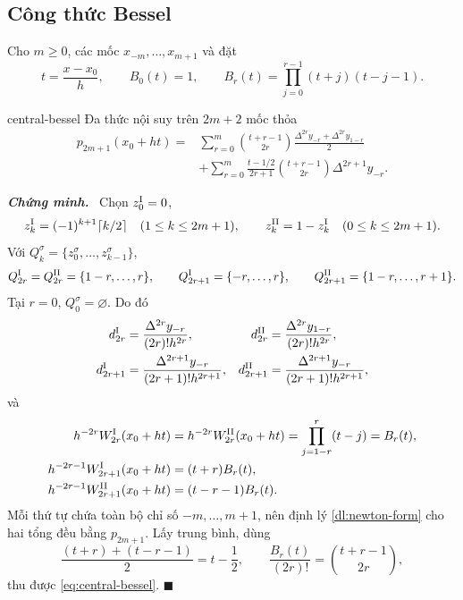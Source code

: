 \documentclass[12pt,a4paper,oneside]{book}
\numberwithin{algorithm}{chapter}
\theoremstyle{definition}
\newenvironment{chungminh}{\par\medskip\noindent\textbf{\textit{\color{mainblue}Chứng minh.}}\ }{\hfill$\blacksquare$\par\medskip}
\begin{document}
\subsection{Công thức Bessel}
Cho $m\geq0$, các mốc $x_{-m},\ldots,x_{m+1}$ và đặt
\[
 t=\frac{x-x_0}{h},\qquad
 B_0(t)=1,\qquad B_r(t)=\prod_{j=0}^{r-1}(t+j)(t-j-1).
\]
\begin{dinhly}{}{central-bessel}
Đa thức nội suy trên $2m+2$ mốc thỏa
\begin{equation}\label{eq:central-bessel}
\begin{split}
 p_{2m+1}(x_0+ht)
 =&\sum_{r=0}^{m}\binom{t+r-1}{2r}
 \frac{\Delta^{2r}y_{-r}+\Delta^{2r}y_{1-r}}2\\
 &+\sum_{r=0}^{m}\frac{t-1/2}{2r+1}\binom{t+r-1}{2r}\Delta^{2r+1}y_{-r}.
\end{split}
\end{equation}
\end{dinhly}
\begin{chungminh}
Chọn $z_0^{\rm I}=0$,
\[
 z_k^{\rm I}=(-1)^{k+1}\lceil k/2\rceil\quad(1\leq k\leq2m+1),\qquad
 z_k^{\rm II}=1-z_k^{\rm I}\quad(0\leq k\leq2m+1).
\]
Với $Q_k^\sigma=\{z_0^\sigma,\ldots,z_{k-1}^\sigma\}$,
\[
 Q_{2r}^{\rm I}=Q_{2r}^{\rm II}=\{1-r,\ldots,r\},\qquad
 Q_{2r+1}^{\rm I}=\{-r,\ldots,r\},\qquad
 Q_{2r+1}^{\rm II}=\{1-r,\ldots,r+1\}.
\]
Tại $r=0$, $Q_0^\sigma=\varnothing$. Do đó
\begin{align*}
 d_{2r}^{\rm I}&=\frac{\Delta^{2r}y_{-r}}{(2r)!h^{2r}},&
 d_{2r}^{\rm II}&=\frac{\Delta^{2r}y_{1-r}}{(2r)!h^{2r}},\\
 d_{2r+1}^{\rm I}&=\frac{\Delta^{2r+1}y_{-r}}{(2r+1)!h^{2r+1}},&
 d_{2r+1}^{\rm II}&=\frac{\Delta^{2r+1}y_{-r}}{(2r+1)!h^{2r+1}},
\end{align*}
và
\begin{align*}
 h^{-2r}W_{2r}^{\rm I}(x_0+ht)
 &=h^{-2r}W_{2r}^{\rm II}(x_0+ht)
 =\prod_{j=1-r}^{r}(t-j)=B_r(t),\\
 h^{-2r-1}W_{2r+1}^{\rm I}(x_0+ht)&=(t+r)B_r(t),\\
 h^{-2r-1}W_{2r+1}^{\rm II}(x_0+ht)&=(t-r-1)B_r(t).
\end{align*}
Mỗi thứ tự chứa toàn bộ chỉ số $-m,\ldots,m+1$, nên định lý \ref{dl:newton-form} cho hai tổng đều bằng $p_{2m+1}$. Lấy trung bình, dùng
\[
 \frac{(t+r)+(t-r-1)}2=t-\frac12,\qquad
 \frac{B_r(t)}{(2r)!}=\binom{t+r-1}{2r},
\]
thu được \eqref{eq:central-bessel}.
\end{chungminh}
\end{document}
